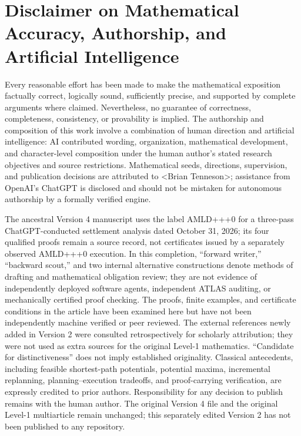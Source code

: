 \documentclass[11pt]{article}
\theoremstyle{definition}\newtheorem{definition}[theorem]{Definition}\newtheorem{assumption}[theorem]{Assumption}
\theoremstyle{remark}\newtheorem{remark}[theorem]{Remark}
\begin{document}

\clearpage
\section*{Disclaimer on Mathematical Accuracy, Authorship, and Artificial Intelligence}\label{sec:disclaimer}
Every reasonable effort has been made to make the mathematical exposition factually correct, logically sound, sufficiently precise, and supported by complete arguments where claimed. Nevertheless, no guarantee of correctness, completeness, consistency, or provability is implied. The authorship and composition of this work involve a combination of human direction and artificial intelligence: AI contributed wording, organization, mathematical development, and character-level composition under the human author's stated research objectives and source restrictions. Mathematical seeds, directions, supervision, and publication decisions are attributed to \textless{}Brian Tenneson\textgreater{}; assistance from OpenAI's ChatGPT is disclosed and should not be mistaken for autonomous authorship by a formally verified engine.

The ancestral Version 4 manuscript uses the label AMLD+++0 for a three-pass ChatGPT-conducted settlement analysis dated October 31, 2026; its four qualified proofs remain a source record, not certificates issued by a separately observed AMLD+++0 execution. In this completion, ``forward writer,'' ``backward scout,'' and two internal alternative constructions denote methods of drafting and mathematical obligation review; they are not evidence of independently deployed software agents, independent ATLAS auditing, or mechanically certified proof checking. The proofs, finite examples, and certificate conditions in the article have been examined here but have not been independently machine verified or peer reviewed. The external references newly added in Version 2 were consulted retrospectively for scholarly attribution; they were not used as extra sources for the original Level-1 mathematics. ``Candidate for distinctiveness'' does not imply established originality. Classical antecedents, including feasible shortest-path potentials, potential maxima, incremental replanning, planning--execution tradeoffs, and proof-carrying verification, are expressly credited to prior authors. Responsibility for any decision to publish remains with the human author. The original Version 4 file and the original Level-1 multiarticle remain unchanged; this separately edited Version 2 has not been published to any repository.
\end{document}
